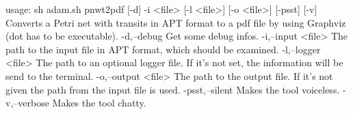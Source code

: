 usage: sh adam.sh pnwt2pdf [-d] -i <file> [-l <file>] [-o <file>] [-psst] [-v]
Converts a Petri net with transits in APT format to a pdf file by using Graphviz (dot has to
be executable).
 -d,--debug           Get some debug infos.
 -i,--input <file>    The path to the input file in APT format, which should be examined.
 -l,--logger <file>   The path to an optional logger file. If it's not set, the information
                      will be send to the terminal.
 -o,--output <file>   The path to the output file. If it's not given the path from the input
                      file is used.
 -psst,--silent       Makes the tool voiceless.
 -v,--verbose         Makes the tool chatty.
